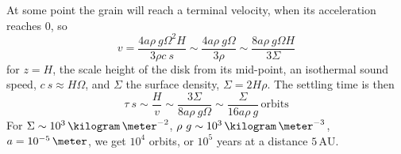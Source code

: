At some point the grain will reach a terminal velocity, when its
acceleration reaches $0$, so
\begin{equation}
  \label{eq:44}
  v = \frac{4 a \rho~g \Omega^2 H}{3 \rho c~s} \sim \frac{4 a \rho~g \Omega}{3 \rho} \sim \frac{8 a \rho~g \Omega H}{3 \Sigma}
\end{equation}
for $z=H$, the scale height of the disk from its mid-point, an
isothermal sound speed, $c~s \approx H \Omega$, and $\Sigma$ the
surface density, $\Sigma = 2 H \rho$. The settling time is then
\begin{equation}
  \label{eq:45}
  \tau~s \sim \frac{H}{v} \sim \frac{3 \Sigma}{8 a \rho~g \Omega} \sim \frac{\Sigma}{16 a \rho~g}\,\text{orbits}
\end{equation}
For $\Sigma \sim 10^3\,\kilogram\,\meter^{-2}$, $\rho~g \sim
10^3\,\kilogram\,\meter^{-3}$, $a = 10^{-5}\,\meter$, we get $10^4$
orbits, or $10^5$ years at a distance $5\,\text{AU}$.

